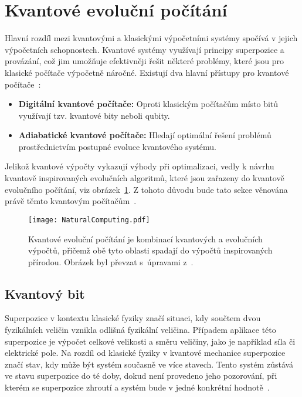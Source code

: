 \section{Kvantové evoluční počítání}
Hlavní rozdíl mezi kvantovými a klasickými výpočetními systémy spočívá v jejich výpočetních schopnostech.
Kvantové systémy využívají principy superpozice a provázání, což jim umožňuje efektivněji řešit některé problémy, které jsou pro klasické počítače výpočetně náročné. 
Existují dva hlavní přístupy pro kvantové počítače~\cite{NaturalComputing}:
\begin{itemize}
    \item \textbf{Digitální kvantové počítače:} Oproti klasickým počítačům místo bitů využívají tzv. kvantové bity neboli qubity.
    \item \textbf{Adiabatické kvantové počítače:} Hledají optimální řešení problémů prostřednictvím postupné evoluce kvantového systému.
\end{itemize}

Jelikož kvantové výpočty vykazují výhody při optimalizaci, vedly k návrhu kvantově inspirovaných evolučních algoritmů, které jsou zařazeny do kvantově evolučního počítání, viz obrázek~\ref{fig:natural-computing}. 
Z tohoto důvodu bude tato sekce věnována právě těmto kvantovým počítačům~\cite{NaturalComputing}. 
\begin{figure}[ht!]
    \centering
    \texttt{[image: NaturalComputing.pdf]}
    \caption{Kvantové evoluční počítání je kombinací kvantových a evolučních výpočtů, přičemž obě tyto oblasti spadají do výpočtů inspirovaných přírodou. Obrázek byl převzat s~úpravami z~\cite{QuantumComputing-QuantumInformation}.}
    \label{fig:natural-computing}
\end{figure}

\subsection{Kvantový bit}
Superpozice v kontextu klasické fyziky značí situaci, kdy součtem dvou fyzikálních veličin vznikla odlišná fyzikální veličina. 
Případem aplikace této superpozice je výpočet celkové velikosti a směru veličiny, jako je například síla či elektrické pole.
Na rozdíl od klasické fyziky v kvantové mechanice superpozice značí stav, kdy může být systém současně ve více stavech. 
Tento systém zůstává ve stavu superpozice do té doby, dokud není provedeno jeho pozorování, při kterém se superpozice zhroutí a systém bude v jedné konkrétní hodnotě~\cite{QuantumComputing-Curious}. 


